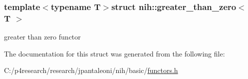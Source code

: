 \subsubsection*{template$<$typename T$>$struct nih\-::greater\-\_\-than\-\_\-zero$<$ T $>$}

greater than zero functor 

\-The documentation for this struct was generated from the following file\-:\begin{DoxyCompactItemize}
\item 
\-C\-:/p4research/research/jpantaleoni/nih/basic/\hyperlink{functors_8h}{functors.\-h}\end{DoxyCompactItemize}

